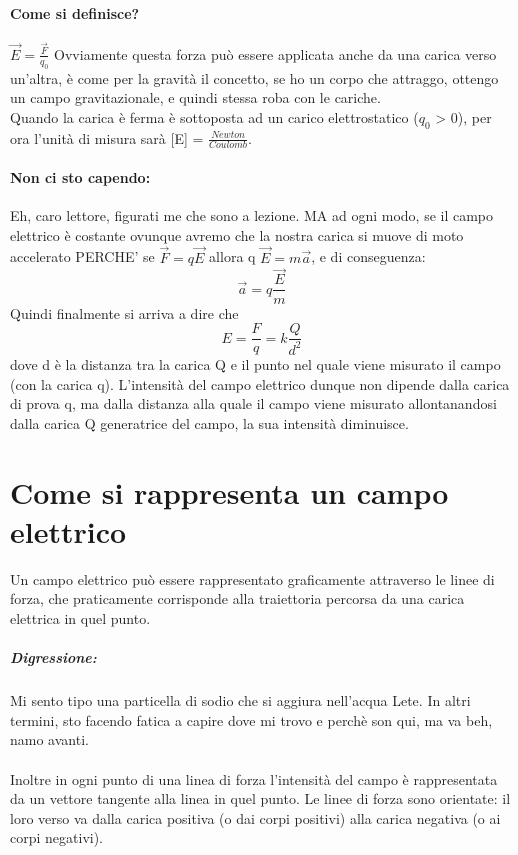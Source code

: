 \documentclass[12pt, a4paper, openany, oneside]{book}
\begin{document}
\paragraph{Come si definisce?} $\overrightarrow{E} = \frac{\overrightarrow{F}}{q_{0}}$
Ovviamente questa forza può essere applicata anche da una carica verso un'altra,
è come per la gravità il concetto, se ho un corpo che attraggo, ottengo un 
campo gravitazionale, e quindi stessa roba con le cariche.
\\
Quando la carica è ferma è sottoposta ad un carico elettrostatico ($q_{0}$ > 0),
per ora l'unità di misura sarà [E] = $\frac{Newton}{Coulomb}$.
\paragraph{Non ci sto capendo: }Eh, caro lettore, figurati me che sono a lezione.
MA ad ogni modo, se il campo elettrico è costante ovunque avremo che la nostra
carica si muove di moto accelerato PERCHE' se $\overrightarrow{F} = q \overrightarrow{E}$ 
allora q $\overrightarrow{E} = m \overrightarrow{a}$, e di conseguenza:
\[
\overrightarrow{a} = q \frac{\overrightarrow{E}}{m}
\]	
Quindi finalmente si arriva a dire che 
\[
E = \frac{F}{q} = k \frac{Q}{d^{2}}
\]
dove d è la distanza tra la carica Q e il punto nel quale viene misurato il 
campo (con la carica q). L'intensità del campo elettrico dunque non dipende 
dalla carica di prova q, ma dalla distanza alla quale il campo viene misurato 
allontanandosi dalla carica Q generatrice del campo, la sua 
intensità diminuisce. 
\section{Come si rappresenta un campo elettrico}
Un campo elettrico può essere rappresentato graficamente attraverso le linee di 
forza, che praticamente corrisponde alla traiettoria percorsa da una carica 
elettrica in quel punto.
\subparagraph{Digressione:} Mi sento tipo una particella di sodio che si aggiura 
nell'acqua Lete. In altri termini, sto facendo fatica a capire dove mi trovo e 
perchè son qui, ma va beh, namo avanti.
\paragraph{}Inoltre in ogni punto di una linea di forza l'intensità del campo
è rappresentata da un vettore tangente alla linea in quel punto. Le linee di
forza sono orientate: il loro verso va dalla carica positiva (o dai corpi
positivi) alla carica negativa (o ai corpi negativi).
\end{document}

